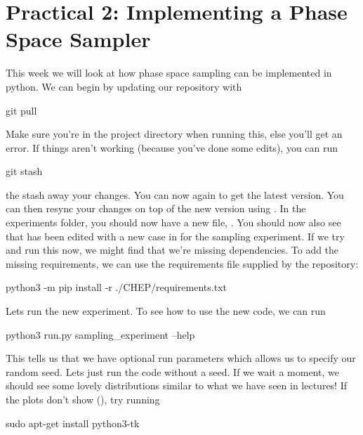 \section*{Practical 2: Implementing a Phase Space Sampler}


This week we will look at how phase space sampling can be implemented in python. We can begin by updating our repository with 
\begin{codeenv}
    git pull
\end{codeenv}
Make sure you're in the project directory when running this, else you'll get an error. If things aren't working (because you've done some edits), you can run
\begin{codeenv}
    git stash
\end{codeenv}
the stash away your changes. You can now  again to get the latest version. You can then resync your changes on top of the new version using .
In the experiments folder, you should now have a new file, .
You should now also see that  has been edited with a new case in  for the sampling experiment. If we try and run this now, we might find that we're missing dependencies. To add the missing requirements, we can use the requirements file supplied by the repository:
\begin{codeenv}
    python3 -m pip install -r ./CHEP/requirements.txt
\end{codeenv}
Lets run the new experiment. To see how to use the new code, we can run
\begin{codeenv}
    python3 run.py sampling_experiment --help
\end{codeenv}
This tells us that we have optional run parameters which allows us to specify our random seed. Lets just run the code without a seed. If we wait a moment, we should see some lovely distributions similar to what we have seen in lectures! If the plots don't show (), try running 
\begin{codeenv}
    sudo apt-get install python3-tk
\end{codeenv}

